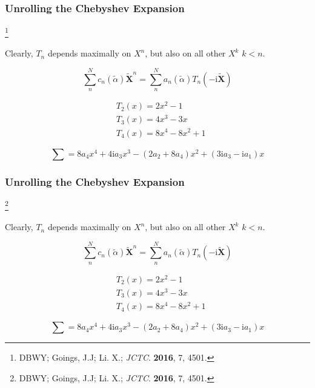 \documentclass{beamer}
\newcommand\blfootnote[1]{%
  \begingroup
  \renewcommand\thefootnote{}\footnote{#1}%
  \addtocounter{footnote}{-1}%
  \endgroup
}
\begin{document}
\begin{frame}
\frametitle{Unrolling the Chebyshev Expansion}
\blfootnote{DBWY; Goings, J.J; Li. X.; \emph{JCTC}. \textbf{2016}, 7, 4501.}

Clearly, $T_n$ depends maximally on $X^n$, but also on all other $X^k$ $k < n$.

\begin{equation*}
\sum_n^N c_n(\tilde{\alpha}) \mathbf{\tilde{X}}^n = \sum_n^N  a_n(\tilde{\alpha})T_n(-\mathrm{i}\tilde{\mathbf{X}})
\end{equation*}

\color{white}
\begin{align*}
&T_2(x) = 2x^2 - 1\\
&T_3(x) = 4x^3 - 3x\\
&T_4(x) = 8x^4 - 8x^2 + 1
\end{align*}

\begin{equation*}
\sum = 8a_4x^4 + 4\mathrm{i}a_3x^3 - (2a_2 + 8a_4)x^2 + (3\mathrm{i}a_3 - \mathrm{i}a_1)x
\end{equation*}

\end{frame}

\begin{frame}
\frametitle{Unrolling the Chebyshev Expansion}
\blfootnote{DBWY; Goings, J.J; Li. X.; \emph{JCTC}. \textbf{2016}, 7, 4501.}

Clearly, $T_n$ depends maximally on $X^n$, but also on all other $X^k$ $k < n$.

\begin{equation*}
\sum_n^N c_n(\tilde{\alpha}) \mathbf{\tilde{X}}^n = \sum_n^N  a_n(\tilde{\alpha})T_n(-\mathrm{i}\tilde{\mathbf{X}})
\end{equation*}

\begin{align*}
&T_2(x) = 2x^2 - 1\\
&T_3(x) = 4x^3 - 3x\\
&T_4(x) = 8x^4 - 8x^2 + 1
\end{align*}

\begin{equation*}
\sum = 8a_4x^4 + 4\mathrm{i}a_3x^3 - (2a_2 + 8a_4)x^2 + (3\mathrm{i}a_3 - \mathrm{i}a_1)x
\end{equation*}

\end{frame}
\end{document}
